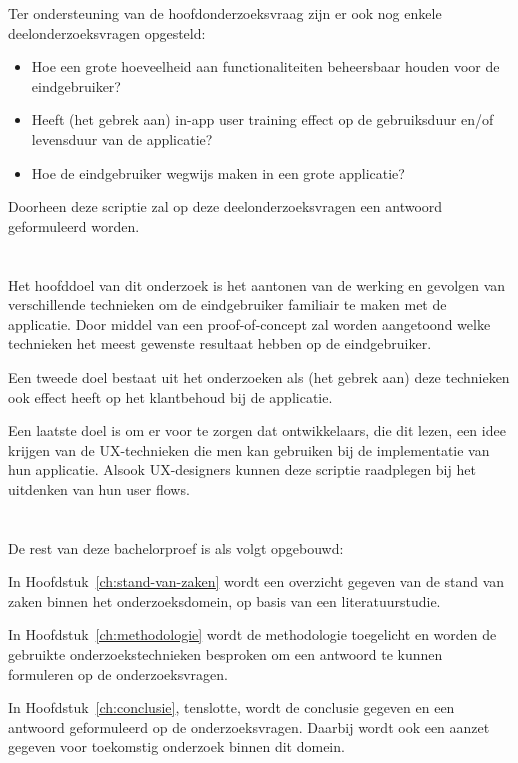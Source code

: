 Ter ondersteuning van de hoofdonderzoeksvraag zijn er ook nog enkele deelonderzoeksvragen opgesteld:

\begin{itemize}
    \item Hoe een grote hoeveelheid aan functionaliteiten beheersbaar houden voor de eindgebruiker?
    \item Heeft (het gebrek aan) in-app user training effect op de gebruiksduur en/of levensduur van de applicatie?
    \item Hoe de eindgebruiker wegwijs maken in een grote applicatie?
\end{itemize}

Doorheen deze scriptie zal op deze deelonderzoeksvragen een antwoord geformuleerd worden.

\section{}
\label{sec:onderzoeksdoelstelling}

Het hoofddoel van dit onderzoek is het aantonen van de werking en gevolgen van verschillende technieken om de eindgebruiker familiair te maken met de applicatie. Door middel van een proof-of-concept zal worden aangetoond welke technieken het meest gewenste resultaat hebben op de eindgebruiker.

Een tweede doel bestaat uit het onderzoeken als (het gebrek aan) deze technieken ook effect heeft op het klantbehoud bij de applicatie.

Een laatste doel is om er voor te zorgen dat ontwikkelaars, die dit lezen, een idee krijgen van de UX-technieken die men kan gebruiken bij de implementatie van hun applicatie. Alsook UX-designers kunnen deze scriptie raadplegen bij het uitdenken van hun user flows.

\section{}
\label{sec:opzet-bachelorproef}


De rest van deze bachelorproef is als volgt opgebouwd:

In Hoofdstuk~\ref{ch:stand-van-zaken} wordt een overzicht gegeven van de stand van zaken binnen het onderzoeksdomein, op basis van een literatuurstudie.

In Hoofdstuk~\ref{ch:methodologie} wordt de methodologie toegelicht en worden de gebruikte onderzoekstechnieken besproken om een antwoord te kunnen formuleren op de onderzoeksvragen.


In Hoofdstuk~\ref{ch:conclusie}, tenslotte, wordt de conclusie gegeven en een antwoord geformuleerd op de onderzoeksvragen. Daarbij wordt ook een aanzet gegeven voor toekomstig onderzoek binnen dit domein.
